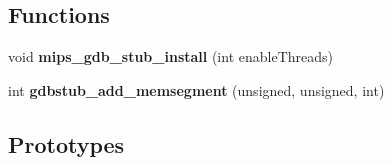 \subsection*{Functions}
\begin{DoxyCompactItemize}
\item 
\mbox{\label{group__mips__gdb_ga3064cc8438f2ea7088c242953659da19}} 
void {\bfseries mips\+\_\+gdb\+\_\+stub\+\_\+install} (int enable\+Threads)
\item 
\mbox{\label{group__mips__gdb_gab8b8367a850a97eeb7ecab306edaf217}} 
int {\bfseries gdbstub\+\_\+add\+\_\+memsegment} (unsigned, unsigned, int)
\end{DoxyCompactItemize}
\subsection*{Prototypes}
